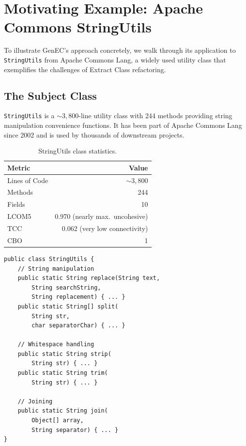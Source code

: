 \documentclass[sigconf]{acmart}
\begin{document}
\section{Motivating Example: Apache Commons StringUtils}
\label{sec:motivating}

To illustrate GenEC's approach concretely, we walk through its application to
\texttt{StringUtils} from Apache Commons Lang, a widely used utility class that
exemplifies the challenges of Extract Class refactoring.

\subsection{The Subject Class}
\label{sec:subject}

\texttt{StringUtils} is a ${\sim}3{,}800$-line utility class with 244 methods
providing string manipulation convenience functions. It has been part of Apache
Commons Lang since 2002 and is used by thousands of downstream projects.

\begin{table}[htbp]
\centering\small
\caption{StringUtils class statistics.}
\label{tab:stringutils-stats}
\begin{tabular}{@{}lr@{}}
\toprule
\textbf{Metric} & \textbf{Value} \\
\midrule
Lines of Code & ${\sim}3{,}800$ \\
Methods & 244 \\
Fields & 10 \\
LCOM5 & 0.970 (nearly max.\ uncohesive) \\
TCC & 0.062 (very low connectivity) \\
CBO & 1 \\
\bottomrule
\end{tabular}
\end{table}

\begin{lstlisting}[style=javacode,caption={Representative subset of StringUtils (244 methods).},label=lst:stringutils]
public class StringUtils {
    // String manipulation
    public static String replace(String text,
        String searchString,
        String replacement) { ... }
    public static String[] split(
        String str,
        char separatorChar) { ... }

    // Whitespace handling
    public static String strip(
        String str) { ... }
    public static String trim(
        String str) { ... }

    // Joining
    public static String join(
        Object[] array,
        String separator) { ... }
}
\end{lstlisting}
\end{document}
